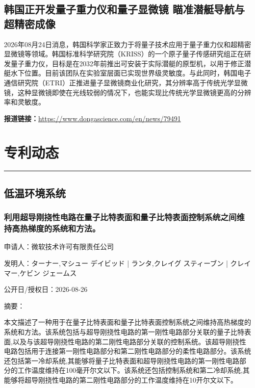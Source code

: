 \documentclass[12pt,a4paper]{ctexart}
\begin{document}
\subsection{ 韩国正开发量子重力仪和量子显微镜 瞄准潜艇导航与超精密成像 }

2026年08月24日消息，韩国科学家正致力于将量子技术应用于量子重力仪和超精密显微镜等领域。韩国标准科学研究院（KRISS）的一个原子量子传感研究组正在研发量子重力仪，目标是在2032年前推出可安装于实际潜艇的原型机，以用于修正潜艇水下位置。目前该团队在实验室层面已实现世界级灵敏度。与此同时，韩国电子通信研究院（ETRI）正推进量子显微镜商业化研究，其分辨率高于传统光学显微镜，这种显微镜即使在光线较弱的情况下，也能实现比传统光学显微镜更高的分辨率和灵敏度。

\noindent\textbf{报道链接：}\url{https://www.dongascience.com/en/news/79491}



\newpage
\section{专利动态}
\vspace{-0.5em}
\noindent\rule{\linewidth}{1.5pt}

\subsection{ 低温环境系统 }

\subsubsection{ 利用超导刚挠性电路在量子比特表面和量子比特表面控制系统之间维持高热梯度的系统和方法。 }

申请人：微软技术许可有限责任公司

发明人：ターナー,マシュー デイビッド | ランタ,クレイグ スティーブン | クレイマー,ケビン ジェームス

公开日/授权日：2026-08-26

摘要：

本文描述了一种用于在量子比特表面和量子比特表面控制系统之间维持高热梯度的系统和方法。该系统包括与超导刚挠性电路的第一刚性电路部分关联的量子比特表面,以及与该超导刚挠性电路的第二刚性电路部分关联的控制系统。该超导刚挠性电路包括用于连接第一刚性电路部分和第二刚性电路部分的柔性电路部分。该系统还包括第一冷却系统,其能够将量子比特表面和超导刚挠性电路的第一刚性电路部分的工作温度维持在100毫开尔文以下。该系统还包括控制系统和第二冷却系统,其能够将超导刚挠性电路的第二刚性电路部分的工作温度维持在10开尔文以下。
\end{document}
